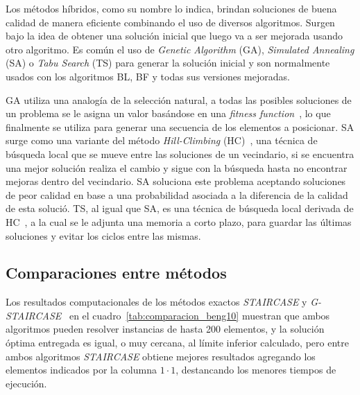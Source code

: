 \documentclass[letter, 10pt]{article}
\begin{document}
Los m\'etodos h\'ibridos, como su nombre lo indica, brindan soluciones de buena calidad de manera eficiente combinando el uso de diversos algoritmos. Surgen bajo la idea de obtener una soluci\'on inicial que luego va a ser mejorada usando otro algoritmo. Es com\'un el uso de \emph{Genetic Algorithm} (GA), \emph{Simulated Annealing} (SA) o \emph{Tabu Search} (TS) para generar la soluci\'on inicial y son normalmente usados con los algoritmos BL, BF y todas sus versiones mejoradas.

GA utiliza una analog\'ia de la selecci\'on natural, a todas las posibles soluciones de un problema se le asigna un valor bas\'andose en una \emph{fitness function}~\cite{thomas2013hybrid}, lo que finalmente se utiliza para generar una secuencia de los elementos a posicionar. SA surge como una variante del m\'etodo \emph{Hill-Climbing} (HC)~\cite{hopper2001empirical}, una t\'ecnica de b\'usqueda local que se mueve entre las soluciones de un vecindario, si se encuentra una mejor soluci\'on realiza el cambio y sigue con la b\'usqueda hasta no encontrar mejoras dentro del vecindario. SA soluciona este problema aceptando soluciones de peor calidad en base a una probabilidad asociada a la diferencia de la calidad de esta soluci\'o. TS, al igual que SA, es una t\'ecnica de b\'usqueda local derivada de HC~\cite{wei2011skyline}, a la cual se le adjunta una memoria a corto plazo, para guardar las \'ultimas soluciones y evitar los ciclos entre las mismas.

\subsection{Comparaciones entre m\'etodos}

Los resultados computacionales de los m\'etodos exactos \emph{STAIRCASE} y \emph{G-STAIRCASE}~\cite{kenmochi2009exact} en el cuadro~\ref{tab:comparacion_beng10} muestran que ambos algoritmos pueden resolver instancias de hasta 200 elementos, y la soluci\'on \'optima entregada es igual, o muy cercana, al l\'imite inferior calculado, pero entre ambos algoritmos \emph{STAIRCASE} obtiene mejores resultados agregando los elementos indicados por la columna $1 \cdot 1$, destancando los menores tiempos de ejecuci\'on.
\end{document}
